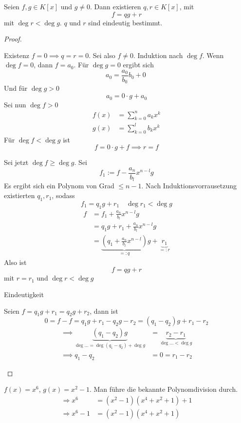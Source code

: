 \documentclass[a4paper, 10pt]{scrbook}
\begin{document}
\begin{thm}
\label{thm:10.14}
Seien $f,g\in K[x]$ und $g\neq 0$.
Dann existieren $q,r\in K[x]$, mit
\[
f=qg+r
\]
mit $\deg r < \deg g$.
$q$ und $r$ sind eindeutig bestimmt.

\begin{proof}
	\begin{seg}{Existenz}
		$f=0 \implies q=r=0$.
Sei also $f\neq 0$.
Induktion nach $\deg f$.
Wenn $\deg f = 0$, dann $f=a_0$.
Für $\deg g=0$ ergibt sich
\[
a_0=\frac {a_0}{b_0}b_0 + 0\
\]
Und für $\deg g > 0$
\[
a_0=0\cdot g + a_0
\]
Sei nun $\deg f>0$
\begin{align*}
f(x)&=\sum_{k=0}^na_kx^k\\
g(x)&=\sum_{k=0}^lb_kx^k
\end{align*}
Für $\deg f < \deg g$ ist
\[
f=0\cdot g + f \implies r=f
\]

Sei jetzt $\deg f\ge \deg g$.
Sei
\[
f_1:=f-\frac{a_n}{b_l}x^{n-l}g
\]
Es ergibt sich ein Polynom von Grad $\le n-1$.
Nach Induktionsvorrausetzung existierten $q_1,r_1$, sodass
\[
f_1=q_1g+r_1 \quad \deg r_1<\deg g
\]
\begin{align*}
f&=f_1+\frac {a_n}{b_l}x^{n-l}g\\
&=q_1g+r_1+\frac {a_n}{b_l}x^{n-l}g\\
&=\underbrace{\left(q_1+\frac{a_n}{b_l}x^{n-l}\right)}_{=:q}g+\underbrace{r_1}_{=:r}
\end{align*}
Also ist
\[
f=qg+r
\]
mit $r=r_1$ und $\deg r<\deg g$
\end{seg}
\begin{seg}{Eindeutigkeit}

Seien $f=q_1g+r_1=q_2g+r_2$, dann ist
\[
0=f-f=q_1g+r_1-q_2g-r_2=(q_1-q_2)g+r_1-r_2
\]
\begin{align*}
\implies \underbrace{(q_1-q_2)g}_{\deg{\dotsc}=\deg(q_1-q_2)+\deg g} &=\underbrace{r_2-r_1}_{\deg{\dotsc}<\deg g}\\
\implies q_1-q_2&=0=r_1-r_2
\end{align*}
\end{seg}
\end{proof}
\end{thm}

\begin{ex}
$f(x)=x^6$, $g(x)=x^2-1$.
Man führe die bekannte Polynomdivision durch.
\begin{align*}
\Rightarrow x^6&=(x^2-1)(x^4+x^2+1)+1 \\
\Rightarrow x^6-1 &= (x^2-1)(x^4+x^2+1)
\end{align*}
\end{ex}
\end{document}
